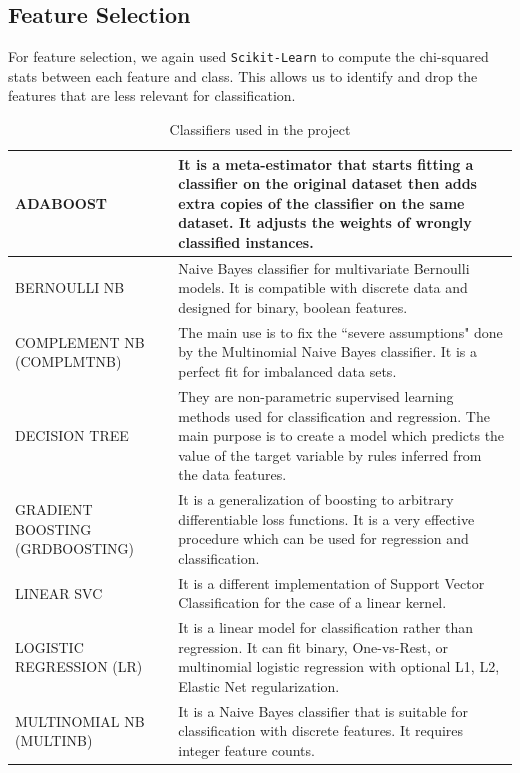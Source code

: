 \documentclass[conference]{IEEEtran}
\begin{document}
\subsection{Feature Selection}

For feature selection, we again used \texttt{Scikit-Learn} to compute the chi-squared stats between each feature and class. This allows us to identify and drop the features that are less relevant for classification.

\begin{table}[!b]
  \caption{Classifiers used in the project}
  \label{tab:classifiers}
  \begin{tabular}{| m{2cm} | m{6cm} |}
    
    \hline
    ADABOOST       & It is a meta-estimator that starts fitting a classifier on the original dataset then adds extra copies of the classifier on the same dataset. It adjusts the weights of wrongly classified instances. \\
    \hline
     BERNOULLI NB & Naive Bayes classifier for multivariate Bernoulli models. It is compatible with discrete data and designed for binary, boolean features. \\
    \hline
     COMPLEMENT NB 
     (COMPLMTNB) & The main use is to fix the ``severe assumptions" done by the Multinomial Naive Bayes classifier. It is a perfect fit for imbalanced data sets. \\
    \hline
    DECISION TREE & They are non-parametric supervised learning methods used for classification and regression. The main purpose is to create a model which predicts the value of the target variable by rules inferred from the data features. \\
    \hline
    GRADIENT BOOSTING
    (GRDBOOSTING) & It is a generalization of boosting to arbitrary differentiable loss functions. It is a very effective procedure which can be used for regression and classification. \\
    \hline
    LINEAR SVC & It is a different implementation of Support Vector Classification for the case of a linear kernel. \\
    \hline
    LOGISTIC REGRESSION
    (LR)& It is a linear model for classification rather than regression. It can fit binary, One-vs-Rest, or multinomial logistic regression with optional L1, L2, Elastic Net regularization. \\
    \hline
    MULTINOMIAL NB
    (MULTINB)& It is a Naive Bayes classifier that is suitable for classification with discrete features. It requires integer feature counts. \\

\end{tabular}
\end{table}
\end{document}
